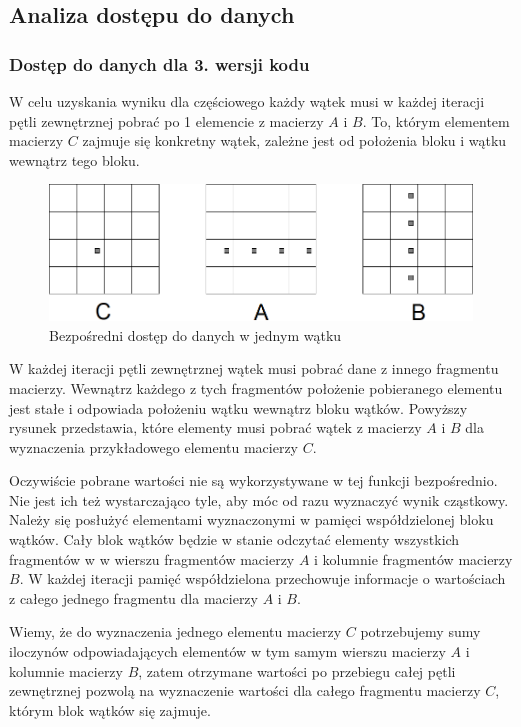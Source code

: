 \documentclass{article}
\begin{document}
\subsection{Analiza dostępu do danych}

\subsubsection{Dostęp do danych dla 3. wersji kodu}

W celu uzyskania wyniku dla częściowego każdy wątek musi w każdej iteracji pętli zewnętrznej pobrać po 1 elemencie z macierzy $A$ i $B$. To, którym elementem macierzy $C$ zajmuje się konkretny wątek, zależne jest od położenia bloku i wątku wewnątrz tego bloku.

\begin{figure}[H]
	\centering
	\includegraphics[width=\linewidth]{./images/3/1.png}
	\caption{Bezpośredni dostęp do danych w jednym wątku}
	\label{fig:image1}
\end{figure}

W każdej iteracji pętli zewnętrznej wątek musi pobrać dane z innego fragmentu macierzy. Wewnątrz każdego z tych fragmentów położenie pobieranego elementu jest stałe i odpowiada położeniu wątku wewnątrz bloku wątków. Powyższy rysunek przedstawia, które elementy musi pobrać wątek z macierzy $A$ i $B$ dla wyznaczenia przykładowego elementu macierzy $C$.

Oczywiście pobrane wartości nie są wykorzystywane w tej funkcji bezpośrednio. Nie jest ich też wystarczająco tyle, aby móc od razu wyznaczyć wynik cząstkowy. Należy się posłużyć elementami wyznaczonymi w pamięci współdzielonej bloku wątków. Cały blok wątków będzie w stanie odczytać elementy wszystkich fragmentów w w wierszu fragmentów macierzy $A$ i kolumnie fragmentów macierzy $B$. W każdej iteracji pamięć współdzielona przechowuje informacje o wartościach z całego jednego fragmentu dla macierzy $A$ i $B$. 

Wiemy, że do wyznaczenia jednego elementu macierzy $C$ potrzebujemy sumy iloczynów odpowiadających elementów w tym samym wierszu macierzy $A$ i kolumnie macierzy $B$, zatem otrzymane wartości po przebiegu całej pętli zewnętrznej pozwolą na wyznaczenie wartości dla całego fragmentu macierzy $C$, którym blok wątków się zajmuje.
\end{document}
